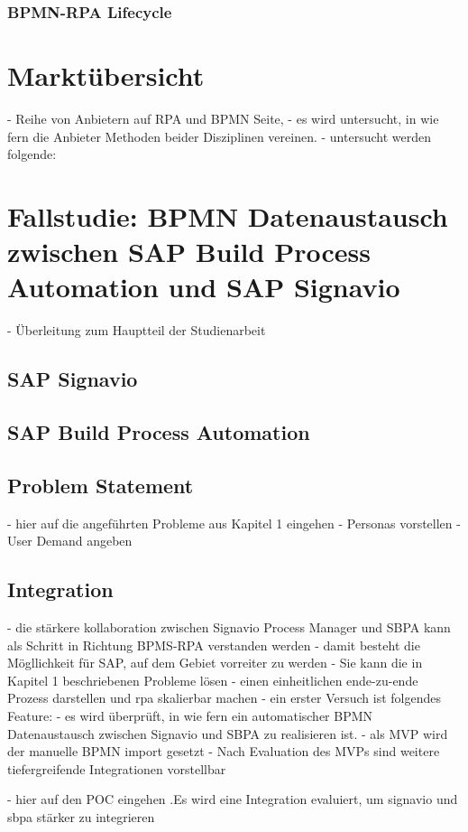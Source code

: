 \subsection{BPMN-RPA Lifecycle}
\chapter{Marktübersicht}
- Reihe von Anbietern auf RPA und BPMN Seite,
- es wird untersucht, in wie fern die Anbieter Methoden beider Disziplinen vereinen.
- untersucht werden folgende:
\chapter{Fallstudie: BPMN Datenaustausch zwischen SAP Build Process Automation und SAP Signavio}

    - Überleitung zum Hauptteil der Studienarbeit
\section{SAP Signavio}
\section{SAP Build Process Automation}

\section{Problem Statement}
    - hier auf die angeführten Probleme aus Kapitel 1 eingehen
    - Personas vorstellen
    - User Demand angeben


   \section{Integration}
   - die stärkere kollaboration zwischen Signavio Process Manager und SBPA kann als Schritt in Richtung BPMS-RPA verstanden werden
   - damit besteht die Mögllichkeit für SAP, auf dem Gebiet vorreiter zu werden
   - Sie kann die in Kapitel 1 beschriebenen Probleme lösen
   - einen einheitlichen ende-zu-ende Prozess darstellen und rpa skalierbar machen
   - ein erster Versuch ist folgendes Feature:
   - es wird überprüft, in wie fern ein automatischer BPMN Datenaustausch zwischen Signavio und SBPA zu realisieren ist.
   - als MVP wird der manuelle BPMN import gesetzt
   - Nach Evaluation des MVPs sind weitere tiefergreifende Integrationen vorstellbar

   - hier auf den POC eingehen
    .Es wird eine Integration evaluiert, um signavio und sbpa stärker zu integrieren
